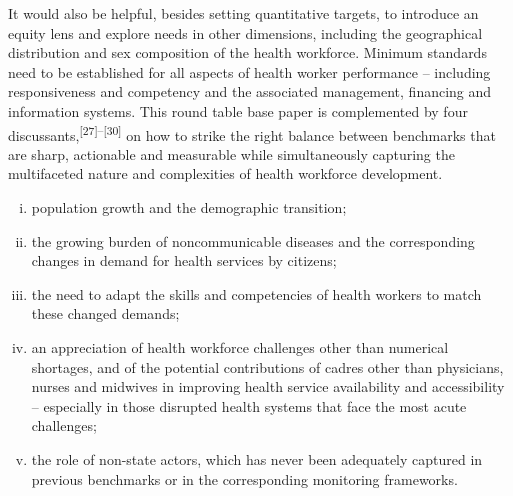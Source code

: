 \documentclass{article}
\begin{document}
It would also be helpful, besides setting quantitative targets, to introduce an
equity lens and
explore needs in other dimensions, including the geographical distribution and
sex composition of
the health workforce. Minimum standards need to be established for all aspects
of health worker
performance – including responsiveness and competency and the associated
management,
financing and information systems. This round table base paper is complemented
by four
discussants,\textsuperscript{[}\textsuperscript{27}\textsuperscript{]}\textsuperscript{–}\textsuperscript{[}\textsuperscript{30}\textsuperscript{]}
on how to strike the right balance between benchmarks
that are sharp, actionable and measurable while simultaneously capturing the
multifaceted nature and
complexities of health workforce development.

\begin{enumerate}[i.]
\item
population growth and the demographic transition;

\item
the growing burden of noncommunicable diseases and the corresponding changes in
demand for health
services by citizens;

\item
the need to adapt the skills and competencies of health workers to match these
changed
demands;

\item
an appreciation of health workforce challenges other than numerical shortages,
and of the
potential contributions of cadres other than physicians, nurses and midwives in
improving health
service availability and accessibility – especially in those disrupted health
systems that
face the most acute challenges;

\item
the role of non-state actors, which has never been adequately captured in
previous benchmarks or
in the corresponding monitoring frameworks.

\end{enumerate}
\end{document}
